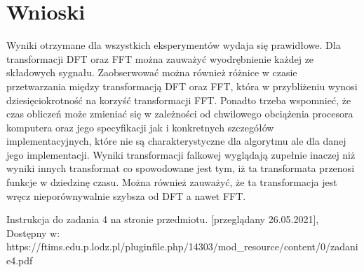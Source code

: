 \documentclass[12pt]{article}
\begin{document}
\section{Wnioski}
Wyniki otrzymane dla wszystkich eksperymentów wydaja się prawidłowe. Dla transformacji DFT oraz FFT można zauważyć wyodrębnienie każdej ze składowych sygnału. Zaobserwować można również różnice w czasie przetwarzania między transformacją DFT oraz FFT, która w przybliżeniu wynosi dziesięciokrotność na korzyść transformacji FFT. Ponadto trzeba wspomnieć, że czas obliczeń może zmieniać się w zależności od chwilowego obciążenia procesora komputera oraz jego specyfikacji jak i konkretnych szczegółów implementacyjnych, które nie są charakterystyczne dla algorytmu ale dla danej jego implementacji.
Wyniki transformacji falkowej wyglądają zupełnie inaczej niż wyniki innych transformat co spowodowane jest tym, iż ta transformata przenosi funkcje w dziedzinę czasu. Można również zauważyć, że ta transformacja jest wręcz nieporównywalnie szybsza od DFT a nawet FFT.
\begin{thebibliography}{}
 Instrukcja do zadania 4 na stronie przedmiotu. [przeglądany 26.05.2021], Dostępny w: https://ftims.edu.p.lodz.pl/pluginfile.php/14303/mod\_resource/content/0/zadanie4.pdf


\end{thebibliography}
\end{document}
